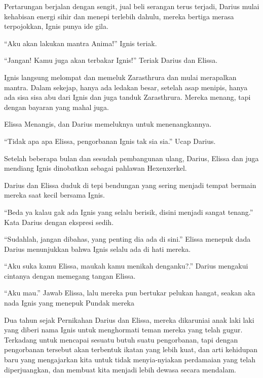 Pertarungan berjalan dengan sengit, jual beli serangan terus terjadi, Darius mulai kehabisan energi sihir dan menepi terlebih dahulu, mereka bertiga merasa terpojokkan, Ignis punya ide gila.


``Aku akan lakukan mantra Anima!'' Ignis teriak.


``Jangan! Kamu juga akan terbakar Ignis!'' Teriak Darius dan Elissa.


Ignis langsung melompat dan memeluk Zarasthrura dan mulai merapalkan mantra. Dalam sekejap, hanya ada ledakan besar, setelah asap menipis, hanya ada sisa sisa abu dari Ignis dan juga tanduk Zarasthrura. Mereka menang, tapi dengan bayaran yang mahal juga.


Elissa Menangis, dan Darius memeluknya untuk menenangkannya.


``Tidak apa apa Elissa, pengorbanan Ignis tak sia sia.'' Ucap Darius.


Setelah beberapa bulan dan sesudah pembangunan ulang, Darius, Elissa dan juga mendiang Ignis dinobatkan sebagai pahlawan Hexenxerkel.


Darius dan Elissa duduk di tepi bendungan yang sering menjadi tempat bermain mereka saat kecil bersama Ignis.


``Beda ya kalau gak ada Ignis yang selalu berisik, disini menjadi sangat tenang.'' Kata Darius dengan ekspresi sedih.


``Sudahlah, jangan dibahas, yang penting dia ada di sini.'' Elissa menepuk dada Darius menunjukkan bahwa Ignis selalu ada di hati mereka.


``Aku suka kamu Elissa, maukah kamu menikah denganku?.'' Darius mengakui cintanya dengan memegang tangan Elissa.


``Aku mau.'' Jawab Elissa, lalu mereka pun bertukar pelukan hangat, seakan aka nada Ignis yang menepuk Pundak mereka


Dua tahun sejak Pernikahan Darius dan Elissa, mereka dikaruniai anak laki laki yang diberi nama Ignis untuk menghormati teman mereka yang telah gugur. Terkadang untuk mencapai sesuatu butuh suatu pengorbanan, tapi dengan pengorbanan tersebut akan terbentuk ikatan yang lebih kuat, dan arti kehidupan baru yang mengajarkan kita untuk tidak menyia-nyiakan perdamaian yang telah diperjuangkan, dan membuat kita menjadi lebih dewasa secara mendalam.

\jedahias
